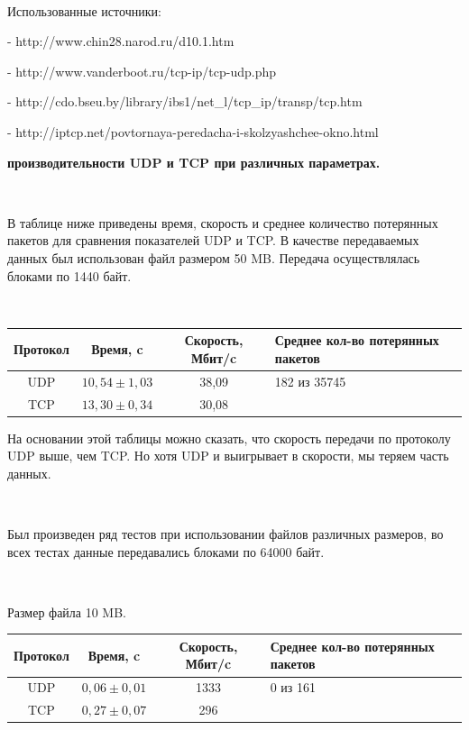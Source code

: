 \documentclass{article}
\begin{document}
~\

Использованные источники:

- http://www.chin28.narod.ru/d10.1.htm 

- http://www.vanderboot.ru/tcp-ip/tcp-udp.php

- http://cdo.bseu.by/library/ibs1/net\_l/tcp\_ip/transp/tcp.htm

- http://iptcp.net/povtornaya-peredacha-i-skolzyashchee-okno.html

\newpage

\textbf{ производительности UDP и TCP при различных параметрах.}

~\

В таблице ниже приведены время, скорость и среднее количество потерянных пакетов для сравнения показателей UDP и TCP. В качестве передаваемых данных был использован файл размером 50 MB. Передача осуществлялась блоками по 1440 байт.

~\

\begin{table}[h]
\begin{tabular}{|c|c|c|p{130pt}|}
\hline
Протокол & Время, c & Скорость, Мбит/c & Среднее кол-во потерянных пакетов \\
\hline
UDP & $10,54 \pm 1,03$ & 38,09 & 182 из 35745\\
TCP & $13,30 \pm 0,34$ & 30,08 &  \\
\hline
\end{tabular}
\end{table}

На основании этой таблицы можно сказать, что скорость передачи по протоколу UDP выше, чем TCP. Но хотя UDP и выигрывает в скорости, мы теряем часть данных.

~\

Был произведен ряд тестов при использовании файлов различных размеров, во всех тестах данные передавались блоками по 64000 байт.

~\

Размер файла 10 MB.

\begin{table}[h!]
\begin{tabular}{|c|c|c|p{130pt}|}
\hline
Протокол & Время, c & Скорость, Мбит/c & Среднее кол-во потерянных пакетов \\
\hline
UDP & $0,06 \pm 0,01$ & 1333 & 0 из 161\\
TCP & $0,27 \pm 0,07$ & 296 &  \\
\hline
\end{tabular}
\end{table}
\end{document}
